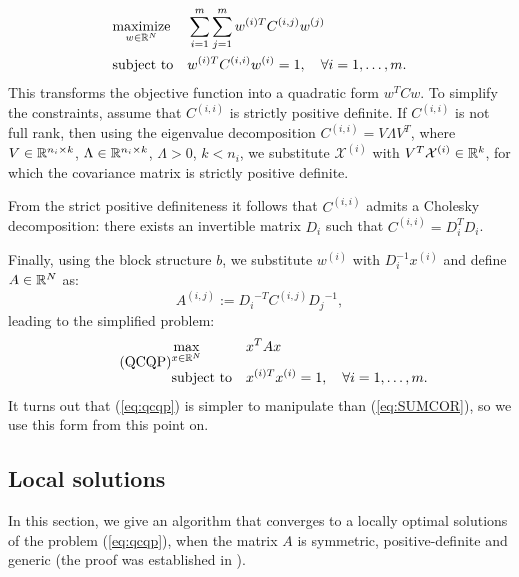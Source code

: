 \begin{equation}\label{eq:qcqp05}
\begin{aligned}
& \underset{w \in \mathbb{R}^N}{\text{maximize}}
& & \sum_{i = 1}^m \sum_{j = 1}^m w^{(i)T} C^{(i,j)} w^{(j)}\\
& \text{subject to}
& &w^{(i)T} C^{(i,i)} w^{(i)} = 1, \quad\forall i = 1,\ldots, m.
\end{aligned}
\end{equation}
This transforms the objective function into a quadratic form $w^T C w$. To
simplify the constraints, assume that $C^{(i,i)}$ is strictly positive definite. 
If $C^{(i,i)}$ is not full rank, then using the eigenvalue decomposition 
$C^{(i,i)} = V \Lambda V^T$, where $V \in \mathbb{R}^{n_i \times k}$, 
$\Lambda \in \mathbb{R}^{n_i \times k}$, $\Lambda > 0$, $k < n_i$, 
we substitute $\mathcal{X}^{(i)}$ with $V^T \mathcal{X}^{(i)} \in \mathbb{R}^k$, 
for which the covariance matrix is strictly positive definite.

From the strict positive definiteness it follows that $C^{(i,i)}$ admits a Cholesky 
decomposition: there exists an invertible matrix $D_i$ such that $C^{(i,i)} = D_i^T D_i$.

Finally, using the block structure $b$, we substitute $w^{(i)}$ 
with $D_i^{-1} x^{(i)}$ and define $A \in \mathbb{R}^N$ as:
\begin{equation*}
A^{(i,j)} := {D_i}^{-T} C^{(i,j)} {D_j}^{-1},
\end{equation*}
leading to the simplified problem:
 \begin{equation}\label{eq:qcqp}
\tag{QCQP}
\begin{aligned}
& \underset{x \in \mathbb{R}^{N}}{\text{max}}
& & x^T A x\\
& \text{subject to}
& &x^{(i)T} x^{(i)} = 1, \quad\forall i = 1, \ldots, m.
\end{aligned}
\end{equation}
It turns out that (\ref{eq:qcqp}) is simpler to  manipulate than  (\ref{eq:SUMCOR}), so we use this form from this point on.

\subsection{Local solutions}\label{chap:extensions:horst}
In this section, we give an algorithm that converges to a locally optimal 
solutions of the problem (\ref{eq:qcqp}), when the matrix $A$ is symmetric,
positive-definite and generic (the proof was established in \cite{Chu}).

